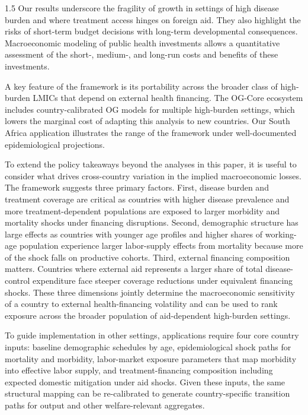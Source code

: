 \documentclass[letterpaper,12pt]{article}
\theoremstyle{definition}
\begin{document}
\begin{spacing}{1.5}
Our results underscore the fragility of growth in settings of high disease burden and where treatment access hinges on foreign aid. They also highlight the risks of short-term budget decisions with long-term developmental consequences. Macroeconomic modeling of public health investments allows a quantitative assessment of the short-, medium-, and long-run costs and benefits of these investments.

A key feature of the framework is its portability across the broader class of high-burden LMICs that depend on external health financing. The OG-Core ecosystem includes country-calibrated OG models for multiple high-burden settings, which lowers the marginal cost of adapting this analysis to new countries. Our South Africa application illustrates the range of the framework under well-documented epidemiological projections.

To extend the policy takeaways beyond the analyses in this paper, it is useful to consider what drives cross-country variation in the implied macroeconomic losses. The framework suggests three primary factors. First, disease burden and treatment coverage are critical as countries with higher disease prevalence and more treatment-dependent populations are exposed to larger morbidity and mortality shocks under financing disruptions. Second, demographic structure has large effects as countries with younger age profiles and higher shares of working-age population experience larger labor-supply effects from mortality because more of the shock falls on productive cohorts. Third, external financing composition matters. Countries where external aid represents a larger share of total disease-control expenditure face steeper coverage reductions under equivalent financing shocks. These three dimensions jointly determine the macroeconomic sensitivity of a country to external health-financing volatility and can be used to rank exposure across the broader population of aid-dependent high-burden settings.

To guide implementation in other settings, applications require four core country inputs: baseline demographic schedules by age, epidemiological shock paths for mortality and morbidity, labor-market exposure parameters that map morbidity into effective labor supply, and treatment-financing composition including expected domestic mitigation under aid shocks. Given these inputs, the same structural mapping can be re-calibrated to generate country-specific transition paths for output and other welfare-relevant aggregates.


\end{spacing}
\end{document}
